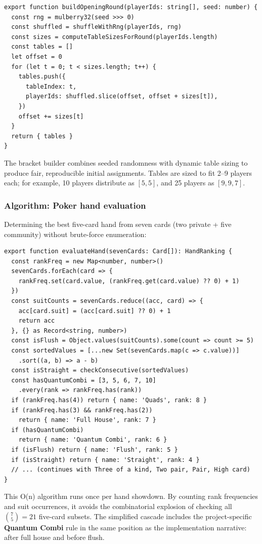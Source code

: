 \documentclass[11pt,a4paper]{article}
\begin{document}
\begin{verbatim}
export function buildOpeningRound(playerIds: string[], seed: number) {
  const rng = mulberry32(seed >>> 0)
  const shuffled = shuffleWithRng(playerIds, rng)
  const sizes = computeTableSizesForRound(playerIds.length)
  const tables = []
  let offset = 0
  for (let t = 0; t < sizes.length; t++) {
    tables.push({
      tableIndex: t,
      playerIds: shuffled.slice(offset, offset + sizes[t]),
    })
    offset += sizes[t]
  }
  return { tables }
}
\end{verbatim}

\noindent The bracket builder combines seeded randomness with dynamic table sizing to produce fair, reproducible initial assignments. Tables are sized to fit 2--9 players each; for example, 10 players distribute as $[5, 5]$, and 25 players as $[9, 9, 7]$.

\subsubsection{Algorithm: Poker hand evaluation}

Determining the best five-card hand from seven cards (two private + five community) without brute-force enumeration:

\begin{verbatim}
export function evaluateHand(sevenCards: Card[]): HandRanking {
  const rankFreq = new Map<number, number>()
  sevenCards.forEach(card => {
    rankFreq.set(card.value, (rankFreq.get(card.value) ?? 0) + 1)
  })
  const suitCounts = sevenCards.reduce((acc, card) => {
    acc[card.suit] = (acc[card.suit] ?? 0) + 1
    return acc
  }, {} as Record<string, number>)
  const isFlush = Object.values(suitCounts).some(count => count >= 5)
  const sortedValues = [...new Set(sevenCards.map(c => c.value))]
    .sort((a, b) => a - b)
  const isStraight = checkConsecutive(sortedValues)
  const hasQuantumCombi = [3, 5, 6, 7, 10]
    .every(rank => rankFreq.has(rank))
  if (rankFreq.has(4)) return { name: 'Quads', rank: 8 }
  if (rankFreq.has(3) && rankFreq.has(2))
    return { name: 'Full House', rank: 7 }
  if (hasQuantumCombi)
    return { name: 'Quantum Combi', rank: 6 }
  if (isFlush) return { name: 'Flush', rank: 5 }
  if (isStraight) return { name: 'Straight', rank: 4 }
  // ... (continues with Three of a kind, Two pair, Pair, High card)
}
\end{verbatim}

\noindent This O(n) algorithm runs once per hand showdown. By counting rank frequencies and suit occurrences, it avoids the combinatorial explosion of checking all $\binom{7}{5}=21$ five-card subsets. The simplified cascade includes the project-specific \textbf{Quantum Combi} rule in the same position as the implementation narrative: after full house and before flush.
\end{document}
